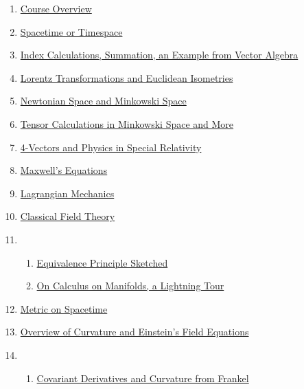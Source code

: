 \documentclass[11pt]{article}
\begin{document}
\vspace{-1cm}

\begin{enumerate}
	\item \href{https://mp.weixin.qq.com/s/ODHfHKOCxy8zZ6ME9lRTnQ}{Course Overview}  %
	\item \href{https://mp.weixin.qq.com/s/E7ivTCqyP-8ZclUUVTKvQQ}{Spacetime or Timespace}  %
	\item \href{https://mp.weixin.qq.com/s/Xp5NfEozTdhh-Ic_ZFn_vQ}{Index Calculations, Summation, an Example from Vector Algebra}  %
	\item \href{https://mp.weixin.qq.com/s/rCjs9mESbFh0LfVzbI4muQ}{Lorentz Transformations and Euclidean Isometries}  %
	\item \href{https://mp.weixin.qq.com/s/IMuSaKp9fGxPcRGse8NmNg}{Newtonian Space and Minkowski Space}  %
	\item \href{https://mp.weixin.qq.com/s/qSpRhHyZVuAquQaMQT2iXQ}{Tensor Calculations in Minkowski Space and More}  %
	\item \href{https://mp.weixin.qq.com/s/c78gWupqwoYFrcID15S5Kw}{4-Vectors and Physics in Special Relativity}  %
	\item \href{https://mp.weixin.qq.com/s/LLJqezrK2VRtrqeE9JmoEA}{Maxwell's Equations}  %
	\item \href{https://mp.weixin.qq.com/s/LiCDB2FahvwI-SpRsKnclA}{Lagrangian Mechanics}  %
	\item \href{https://mp.weixin.qq.com/s/VHz4NLlrxbjUv8vSuz24dw}{Classical Field Theory}  %
	\item 
	\begin{enumerate}
		\item \href{https://mp.weixin.qq.com/s/XmgYuWflwccMv1Jlt5Fptg}{Equivalence Principle Sketched}  %
		\item \href{https://mp.weixin.qq.com/s/Kbwn-weAlNAEOfqd2X1AMg}{On Calculus on Manifolds, a Lightning Tour}  %
	\end{enumerate}
	\item \href{https://mp.weixin.qq.com/s/wzUWhQ28UCDslp_JDCla8A}{Metric on Spacetime}  %
	\item \href{https://mp.weixin.qq.com/s/4SFwUFeEbz4nuWuL0Y7Wyw}{Overview of Curvature and Einstein's Field Equations}  %
	\item 
	\begin{enumerate}
		\item \href{https://mp.weixin.qq.com/s/QQNNsHCO0jIdUnKUzBNS1A}{Covariant Derivatives and Curvature from Frankel}  %

\end{enumerate}
\end{enumerate}
\end{document}
